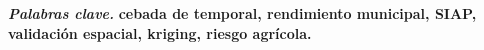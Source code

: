\documentclass[conference,letterpaper]{IEEEtran}
\begin{document}
\smallskip
\noindent\textbf{\textit{Palabras clave.}} \bfseries cebada de temporal, rendimiento municipal, SIAP, validación
espacial, kriging, riesgo agrícola.\par\mdseries







\FloatBarrier


\end{document}
